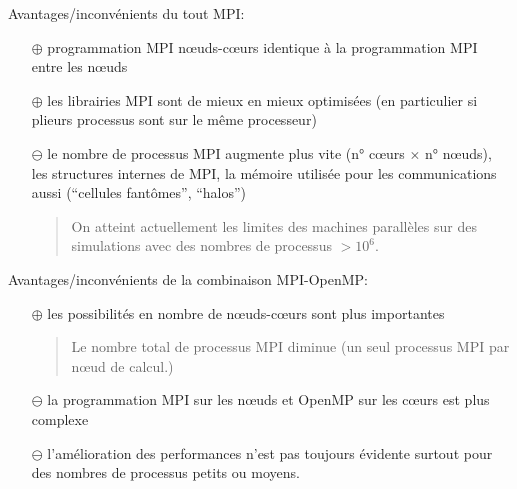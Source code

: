 \documentclass{beamer}
\begin{document}
\begin{frame}
	
\vfill

Avantages/inconvénients du tout MPI:
	
\vfill
\begin{itemize}
	\item[\LARGE $\mathbf\oplus$] programmation MPI n\oe uds-c\oe urs identique à la programmation MPI entre les n\oe uds
	\vfill
	
	\item[\LARGE $\mathbf\oplus$] les librairies MPI sont de mieux en mieux optimisées (en particulier si plieurs processus sont sur le même processeur)
	
\vfill
	\item[\LARGE $\mathbf\ominus$] le nombre de processus MPI augmente plus vite (n° c\oe urs $\times$ n° n\oe uds), les structures internes de MPI, la mémoire utilisée pour les communications aussi (``cellules fant\^omes'', ``halos'')
	\bigskip
	
\bigskip

	\begin{quote}
On atteint actuellement les limites des machines parallèles sur des simulations avec des nombres de processus $> 10^6$.
	\end{quote}
	
\end{itemize}
\vfill
\end{frame}

\begin{frame}


\vfill
	Avantages/inconvénients de la combinaison MPI-OpenMP:
	
\vfill
	\begin{itemize}
		\item[\LARGE $\mathbf\oplus$] les possibilités en nombre de n\oe uds-c\oe urs sont plus importantes
		
\begin{quotation}\noindent%
Le nombre total de processus MPI diminue (un seul processus MPI par n\oe ud de calcul.)
\end{quotation}
	
\vfill
		\item[\LARGE $\mathbf\ominus$] la programmation MPI sur les n\oe uds et OpenMP sur les c\oe urs est plus complexe
	
\vfill
		\item[\LARGE $\mathbf\ominus$] l'amélioration des performances n'est pas toujours évidente surtout pour des nombres de processus petits ou moyens.
	\end{itemize}
	
	\vfill
\end{frame}
\end{document}
